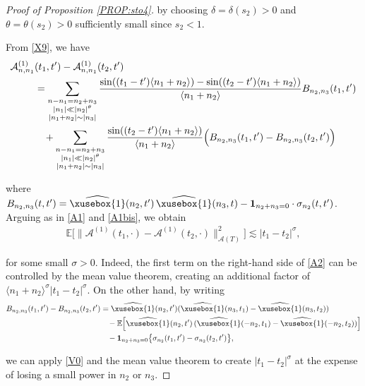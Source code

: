 \documentclass[%
11pt,  reqno]{amsart}
\def\<#1>{\xusebox{#1}}
\newcommand{\1}{\hspace{0.2mm}\text{I}\hspace{0.2mm}}
\newcommand{\noi}{\noindent}
\newcommand{\E}{\mathbb{E}}
\newcommand{\dl}{\delta}
\newcommand{\s}{\sigma}
\newcommand{\ft}{\widehat}
\newcommand{\ta}{\theta}
\newcommand{\les}{\lesssim}
\newcommand{\jb}[1]
{\langle #1 \rangle}
\newcommand{\ind}{\mathbf 1}
\newcommand{\A}{\mathcal{A}}
\numberwithin{equation}{section}
\numberwithin{theorem}{section}
\begin{document}
\begin{proof}[Proof of Proposition \ref{PROP:sto4}]
\noi
by choosing $\dl = \dl(s_2) > 0$ and $\theta = \ta(s_2)>0$
sufficiently small since $s_2<1$.


From \eqref{X9}, we have
\begin{align}
\begin{split}
\A^{(1)}_{n, n_1}
&  (t_1, t')
 - \A^{(1)}_{n, n_1} (t_2, t')\\
& =\sum_{\substack{n - n_1 =  n_2 + n_3\\ |n_1| \ll |n_2|^\theta \\ |n_1 + n_2|\sim |n_3|}}
 \frac{\sin ((t_1 - t') \jb{ n_1 + n_2 }) - \sin ((t_2 - t') \jb{ n_1 + n_2 })}{\jb{ n_1 + n_2 }} 
B_{n_2, n_3}(t_1, t')
 \\
& \hphantom{X}
+ \sum_{\substack{n - n_1 =  n_2 + n_3\\ |n_1| \ll |n_2|^\theta \\ |n_1 + n_2|\sim |n_3|}}
 \frac{\sin ((t_2 - t') \jb{ n_1 + n_2 })}{\jb{ n_1 + n_2 }} 
\Big( B_{n_2, n_3}(t_1, t') - B_{n_2, n_3}(t_2, t')\Big)
\end{split}
\label{A2}
\end{align}

\noi
where $B_{n_2, n_3}(t, t') =  \ft{\<1>}(n_2, t') \, \ft{\<1>}(n_3, t) - \ind_{n_2 + n_3 = 0}\cdot \s_{n_2}(t, t')$.
Arguing as in \eqref{A1} and \eqref{A1bis}, we obtain
\begin{align*}
\E\big[\|\A^{(1)} (t_1, \cdot)-\A^{(1)} (t_2, \cdot)\|_{\A(T)}^2\big] \les |t_1-t_2|^{\s},
\end{align*}




\noi
for some small $\s>0$. 
Indeed, the first term on the right-hand side of \eqref{A2}
can be controlled by the mean value theorem, 
creating an additional factor of $\jb{n_1+n_2}^\s |t_1 - t_2|^\s$.
On the other hand, by writing
\begin{align*}
B_{n_2, n_3}(t_1, t')
- B_{n_2, n_3}(t_2, t')
&  =  \ft{\<1>}(n_2, t')  (\ft{\<1>}(n_3, t_1)- \ft{\<1>}(n_3, t_2))\\ 
 & \hphantom{X} 
- \E\Big[  \ft{\<1>}(n_2, t') \, (\ft{\<1>}(-n_2, t_1)- \ft{\<1>}(-n_2, t_2))\Big]\\
 & \hphantom{X} 
 - \ind_{n_2 + n_3 = 0}\big\{ \s_{n_2}(t_1, t') - \s_{n_2}(t_2, t')\big\}, 
\end{align*}

\noi
we can apply \eqref{V0} and the mean value theorem
to create $|t_1 - t_2|^\s$ at the expense of losing a small power
in $n_2$ or $n_3$.




\end{proof}
\end{document}
